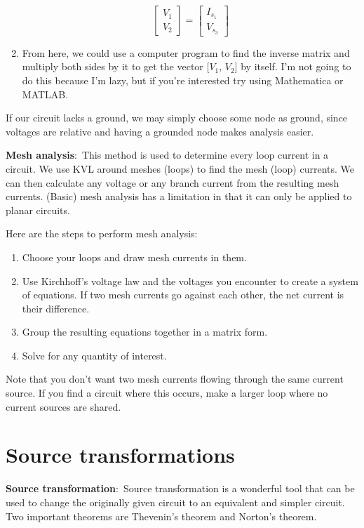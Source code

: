 \documentclass[nobib]{tufte-handout}
\newcommand{\defn}[2]{\noindent\textbf{#1}:\ #2}
\begin{document}
\begin{enumerate}
\[    \begin{bmatrix}
        V_1 \\
        V_2
    \end{bmatrix}
     =
    \begin{bmatrix}
        I_{s_1} \\
        V_{s_3}
    \end{bmatrix} \]
    \item From here, we could use a computer program to find the inverse matrix
    and multiply both sides by it to get the vector [$V_1$, $V_2$] by itself. 
    I'm not going to do this because I'm lazy, but if you're interested try 
    using Mathematica or MATLAB. 
\end{enumerate}

If our circuit lacks a ground, we may simply choose some node as ground, since
voltages are relative and having a grounded node makes analysis easier. 



\defn{Mesh analysis}{This method is used to determine every loop current in a circuit. We
use KVL around meshes (loops) to find the mesh (loop) currents. We
can then calculate any voltage or any branch current from the resulting
mesh currents. (Basic) mesh analysis has a limitation in that it can only
be applied to planar circuits}.

Here are the steps to perform mesh analysis: 
\begin{enumerate}
    \item Choose your loops and draw mesh currents in them. 
    \item Use Kirchhoff's voltage law and the voltages you encounter 
    to create a system of equations. If two mesh currents 
    go against each other, the net current is their difference. 
    \item Group the resulting equations together in a matrix form.
    \item Solve for any quantity of interest. 
\end{enumerate}

Note that you don't want two mesh currents flowing through the same 
current source. If you find a circuit where this occurs, make a 
larger loop where no current sources are shared. 

\section{Source transformations}
\defn{Source transformation}{Source transformation is a 
wonderful tool that can be used to change the
originally given circuit to an equivalent and simpler circuit}.
Two important theorems are Thevenin's theorem and Norton's theorem.
\end{document}

